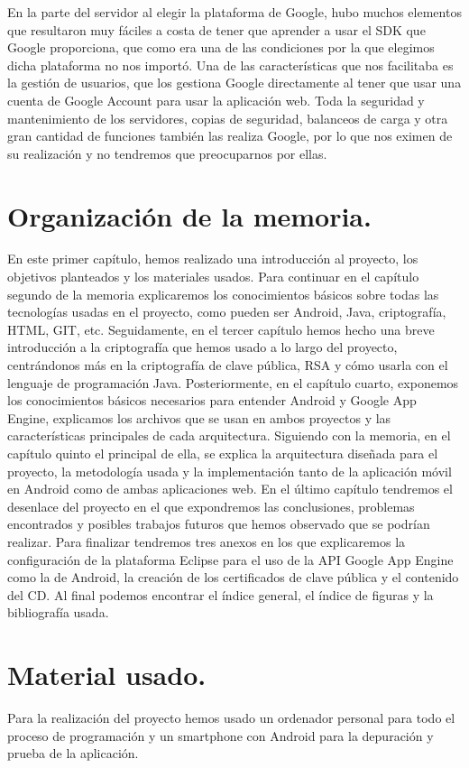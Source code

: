 En la parte del servidor al elegir la plataforma de Google, hubo muchos elementos que resultaron muy fáciles a costa de tener que aprender a usar el SDK que Google proporciona, que como era una de las condiciones por la que elegimos dicha plataforma no nos importó. Una de las características que nos facilitaba es la gestión de usuarios, que los gestiona Google directamente al tener que usar una cuenta de Google Account para usar la aplicación web. Toda la seguridad y mantenimiento de los servidores, copias de seguridad, balanceos de carga y otra gran cantidad de funciones también las realiza Google, por lo que nos eximen de su realización y no tendremos que preocuparnos por ellas.

\section{Organización de la memoria.}

En este primer capítulo, hemos realizado una introducción al proyecto, los objetivos planteados y los materiales usados. Para continuar en el capítulo segundo de la memoria explicaremos los conocimientos básicos sobre todas las tecnologías usadas en el proyecto, como pueden ser Android, Java, criptografía, HTML, GIT, etc. Seguidamente, en el tercer capítulo hemos hecho una breve introducción a la criptografía que hemos usado a lo largo del proyecto, centrándonos más en la criptografía de clave pública, RSA y cómo usarla con el lenguaje de programación Java. Posteriormente, en el capítulo cuarto, exponemos los conocimientos básicos necesarios para entender Android y Google App Engine, explicamos los archivos que se usan en ambos proyectos y las características principales de cada arquitectura. Siguiendo con la memoria, en el capítulo quinto el principal de ella, se explica la arquitectura diseñada para el proyecto, la metodología usada y la implementación tanto de la aplicación móvil en Android como de ambas aplicaciones web. En el último capítulo tendremos el desenlace del proyecto en el que expondremos las conclusiones, problemas encontrados y posibles trabajos futuros que hemos observado que se podrían realizar. Para finalizar tendremos tres anexos en los que explicaremos la configuración de la plataforma Eclipse para el uso de la API Google App Engine como la de Android, la creación de los certificados de clave pública y el contenido del CD. Al final podemos encontrar el índice general, el índice de figuras y la bibliografía usada.

\section{Material usado.}
Para la realización del proyecto hemos usado un ordenador personal para todo el proceso de programación y un smartphone con Android para la depuración y prueba de la aplicación. 

